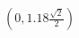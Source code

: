 \documentclass[preview]{standalone}
\begin{document}
\begin{align*}
(0, 1.18 \frac{ \sqrt{2} }{2})
\end{align*}
\end{document}
